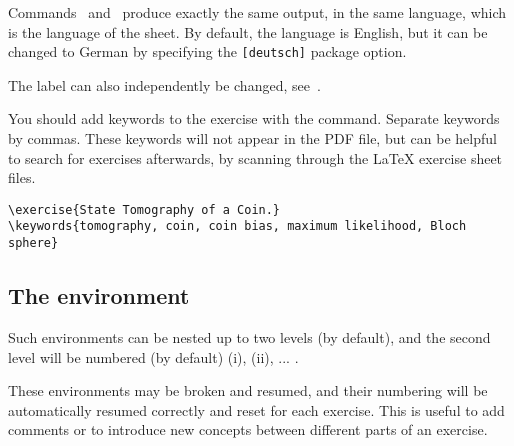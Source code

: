 \documentclass[11pt,a4paper]{article}
\begin{document}
\begin{pkgnotice}
  Commands~ and~ produce exactly the same output, in
  the same language, which is the language of the sheet. By default, the language is
  English, but it can be changed to German by specifying the \texttt{[deutsch]} package
  option.

  The label can also independently be changed, see~.
\end{pkgnotice}

You should add keywords to the exercise with the  command. Separate
keywords by commas. These keywords will not appear in the PDF file, but can be helpful to
search for exercises afterwards, by scanning through the \LaTeX{} exercise sheet files.
\begin{pkgverbatim}
\begin{verbatim}
\exercise{State Tomography of a Coin.}
\keywords{tomography, coin, coin bias, maximum likelihood, Bloch sphere}
\end{verbatim}
\end{pkgverbatim}





\subsection{The  environment}


Such  environments can be nested up to two levels (by default), and
the second level will be numbered (by default) (i), (ii), ... .

These environments may be broken and resumed, and their numbering will be automatically
resumed correctly and reset for each exercise. This is useful to add comments or to
introduce new concepts between different parts of an exercise.
\end{document}
